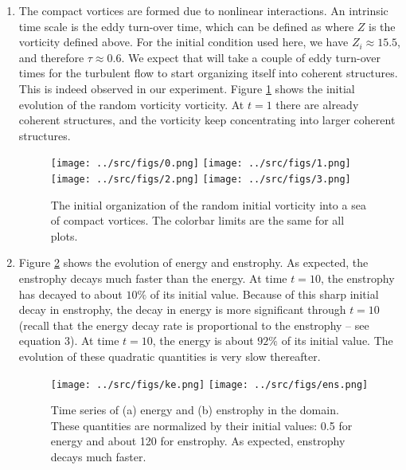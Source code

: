 \documentclass[11pt]{article}
\begin{document}
\begin{enumerate}
    \item The compact vortices are formed due to nonlinear interactions. An intrinsic
        time scale is the eddy turn-over time, which can be defined as \citep[e.g. ][]{mcwilliams1984}
        \beq
            \tau {} {}\com
        \eeq
        where $Z$ is the vorticity defined above. For the initial condition used here, we have $Z_i \approx 15.5$,
        and therefore $\tau \approx 0.6$. We expect that will take a couple of eddy turn-over times for the turbulent
        flow to start organizing itself into coherent structures. This is indeed observed in our experiment. Figure
        \ref{fig:init_vort} shows the initial evolution of the random vorticity vorticity. At $t=1$ there are already
        coherent structures, and the vorticity keep concentrating into larger coherent structures.

\begin{figure}[ht]
\begin{center}
\texttt{[image: ../src/figs/0.png]} 
    \texttt{[image: ../src/figs/1.png]} \\ 
    \texttt{[image: ../src/figs/2.png]} 
    \texttt{[image: ../src/figs/3.png]} 
\end{center}
\caption{The initial organization of the random initial vorticity into a sea of compact vortices.
  The colorbar limits are the same for all plots.}
\label{fig:init_vort}
\end{figure}

    \item Figure \ref{fig:ke_ens} shows the evolution of energy and enstrophy. As expected, the enstrophy decays
        much faster than the energy. At time $t=10$, the enstrophy has decayed to about $10\%$ of its initial value.
        Because of this sharp initial decay in enstrophy, the decay in energy is more significant through $t=10$
        (recall that the energy decay rate is proportional to the enstrophy – see equation 3). At time $t=10$, the energy is about
        $92\%$ of its initial value. The evolution of these quadratic quantities is very slow thereafter. 

\begin{figure}[ht]
\begin{center}
\texttt{[image: ../src/figs/ke.png]} 
    \texttt{[image: ../src/figs/ens.png]}
\end{center}
\caption{Time series of (a) energy and (b) enstrophy in the domain. These quantities are normalized by
their initial values: 0.5 for energy and about 120 for enstrophy. As expected, enstrophy decays much
faster.}
\label{fig:ke_ens}
\end{figure}




\end{enumerate}
\end{document}
